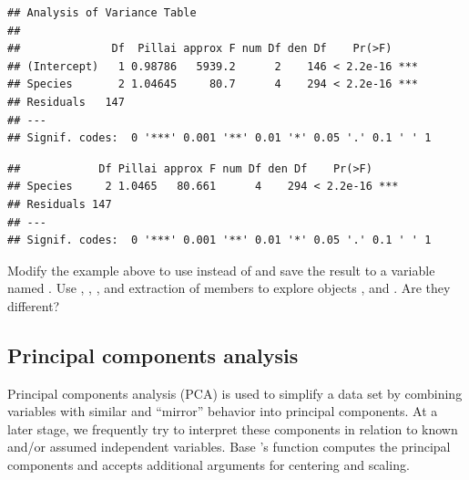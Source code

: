 \documentclass[krantz2]{krantz}\usepackage{knitr}
\begin{document}
\begin{knitrout}\footnotesize
{}\color{fgcolor}\begin{kframe}
\begin{alltt}
 \hlkwb{<-} \hlstd{(} \hlopt{~}    
\end{alltt}
\begin{verbatim}
## Analysis of Variance Table
## 
##              Df  Pillai approx F num Df den Df    Pr(>F)    
## (Intercept)   1 0.98786   5939.2      2    146 < 2.2e-16 ***
## Species       2 1.04645     80.7      4    294 < 2.2e-16 ***
## Residuals   147                                             
## ---
## Signif. codes:  0 '***' 0.001 '**' 0.01 '*' 0.05 '.' 0.1 ' ' 1
\end{verbatim}
\begin{alltt}
\end{alltt}
\begin{verbatim}
##            Df Pillai approx F num Df den Df    Pr(>F)    
## Species     2 1.0465   80.661      4    294 < 2.2e-16 ***
## Residuals 147                                            
## ---
## Signif. codes:  0 '***' 0.001 '**' 0.01 '*' 0.05 '.' 0.1 ' ' 1
\end{verbatim}
\end{kframe}
\end{knitrout}

\begin{advplayground}
Modify the example above to use  instead of  and save the result to a variable named .
Use , , ,  and extraction of members to explore objects ,  and . Are they different?
\end{advplayground}


\subsection{Principal components analysis}\label{sec:stat:PCA}

Principal components analysis (PCA) is used to simplify a data set by combining variables with similar and ``mirror'' behavior into principal components. At a later stage, we frequently try to interpret these components in relation to known and/or assumed independent variables. Base \Rlang's function  computes the principal components and accepts additional arguments for centering and scaling.
\end{document}
